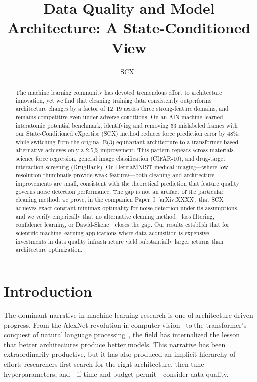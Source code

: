 \documentclass[12pt,a4paper]{article}
\title{Data Quality and Model Architecture: A State-Conditioned View}
\author{SCX\ }
\begin{document}
\maketitle

\begin{abstract}
The machine learning community has devoted tremendous effort to architecture innovation, yet we find that cleaning training data consistently outperforms architecture changes by a factor of 12--19 across three strong-feature domains, and remains competitive even under adverse conditions. On an AlN machine-learned interatomic potential benchmark, identifying and removing 53 mislabeled frames with our State-Conditioned eXpertise (SCX) method reduces force prediction error by 48\%, while switching from the original E(3)-equivariant architecture to a transformer-based alternative achieves only a 2.5\% improvement. This pattern repeats across materials science force regression, general image classification (CIFAR-10), and drug-target interaction screening (DrugBank). On DermaMNIST medical imaging---where low-resolution thumbnails provide weak features---both cleaning and architecture improvements are small, consistent with the theoretical prediction that feature quality governs noise detection performance. The gap is not an artifact of the particular cleaning method: we prove, in the companion Paper~I~[arXiv:XXXX], that SCX achieves exact constant minimax optimality for noise detection under its assumptions, and we verify empirically that no alternative cleaning method---loss filtering, confidence learning, or Dawid-Skene---closes the gap. Our results establish that for scientific machine learning applications where data acquisition is expensive, investments in data quality infrastructure yield substantially larger returns than architecture optimization.
\end{abstract}

\section{Introduction}

The dominant narrative in machine learning research is one of architecture-driven progress. From the AlexNet revolution in computer vision~\cite{krizhevsky2012imagenet} to the transformer's conquest of natural language processing~\cite{vaswani2017attention}, the field has internalized the lesson that better architectures produce better models. This narrative has been extraordinarily productive, but it has also produced an implicit hierarchy of effort: researchers first search for the right architecture, then tune hyperparameters, and---if time and budget permit---consider data quality.
\end{document}
